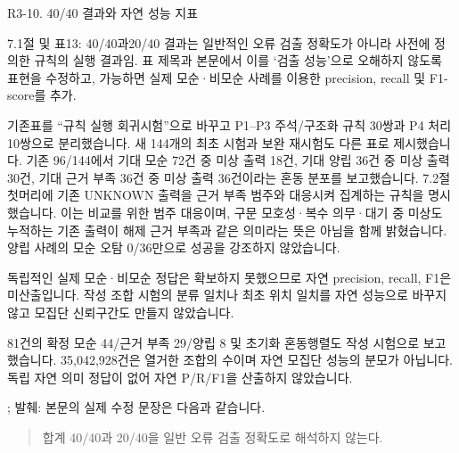\clearpage

\begin{reviewitem}{R3-10. 40/40 결과와 자연 성능 지표}

\begin{reviewercomment}

7.1절 및 표13: 40/40과20/40 결과는 일반적인 오류 검출 정확도가 아니라 사전에 정의한 규칙의 실행 결과임. 표 제목과 본문에서 이를 ‘검출 성능’으로 오해하지 않도록 표현을 수정하고, 가능하면 실제 모순·비모순 사례를 이용한 precision, recall 및 F1-score를 추가.

\end{reviewercomment}

\begin{authorresponse}

기존표를 ``규칙 실행 회귀시험''으로 바꾸고 P1–P3 주석/구조화 규칙 30쌍과 P4 처리 10쌍으로 분리했습니다. 새 144개의 최초 시험과 보완 재시험도 다른 표로 제시했습니다. 기존 96/144에서 기대 모순 72건 중 미상 출력 18건, 기대 양립 36건 중 미상 출력 30건, 기대 근거 부족 36건 중 미상 출력 36건이라는 혼동 분포를 보고했습니다. 7.2절 첫머리에 기존 UNKNOWN 출력을 근거 부족 범주와 대응시켜 집계하는 규칙을 명시했습니다. 이는 비교를 위한 범주 대응이며, 구문 모호성·복수 의무·대기 중 미상도 누적하는 기존 출력이 해제 근거 부족과 같은 의미라는 뜻은 아님을 함께 밝혔습니다. 양립 사례의 모순 오탐 0/36만으로 성공을 강조하지 않았습니다.

독립적인 실제 모순·비모순 정답은 확보하지 못했으므로 자연 precision, recall, F1은 미산출입니다. 작성 조합 시험의 분류 일치나 최초 위치 일치를 자연 성능으로 바꾸지 않고 모집단 신뢰구간도 만들지 않았습니다.

81건의 확정 모순 44/근거 부족 29/양립 8 및 초기화 혼동행렬도 작성 시험으로 보고했습니다. 35,042,928건은 열거한 조합의 수이며 자연 모집단 성능의 분모가 아닙니다. 독립 자연 의미 정답이 없어 자연 P/R/F1을 산출하지 않았습니다.

\end{authorresponse}

\begin{manuscriptrevision}{; 발췌: }
본문의 실제 수정 문장은 다음과 같습니다.

\begin{quote}
합계 40/40과 20/40을 일반 오류 검출 정확도로 해석하지 않는다.
\end{quote}
\end{manuscriptrevision}

\end{reviewitem}

